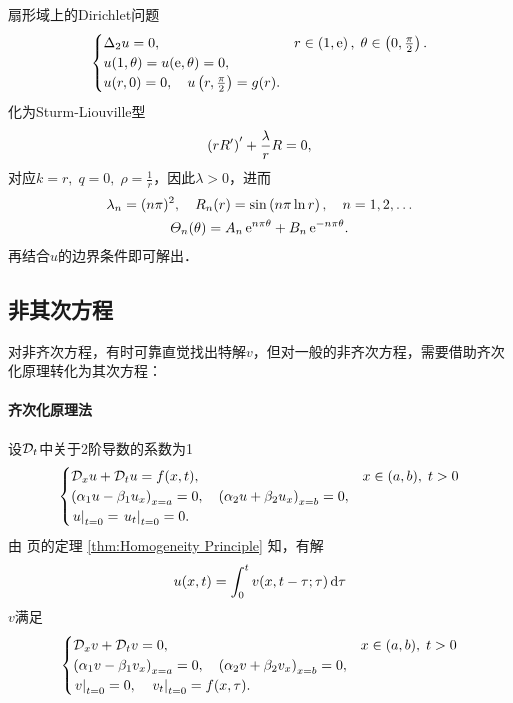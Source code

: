 \eg 扇形域上的Dirichlet问题
\begin{align*}
	\begin{cases}
		\Delta_2u=0,&r\in\left(1,\mathrm e\right),\;\theta\in\left(0,\frac\pi{2}\right).\\
		u(1,\theta)=u(\mathrm e,\theta)=0,\\
		u(r,0)=0,\quad u\left(r,\frac\pi{2}\right)=g(r).
	\end{cases}
\end{align*}
化为Sturm-Liouville型
\[\left(rR'\right)'+\frac{\lambda}rR=0,\]
对应\(k=r,\;q=0,\;\rho=\frac1r\)，因此\(\lambda>0\)，进而
\begin{gather*}
	\lambda_n=(n\pi)^2,\quad R_n(r)=\sin\left(n\pi\ln r\right),\quad n=1,2,\ldots
	\\
	\varTheta_n(\theta)=A_n\mathop{}\!\mathrm{e}^{n\pi\theta}+B_n\mathop{}\!\mathrm{e}^{-n\pi\theta}.
\end{gather*}
再结合$u$的边界条件即可解出．
\subsection{非其次方程}
对非齐次方程，有时可靠直觉找出特解$v$，但对一般的非齐次方程，需要借助齐次化原理转化为其次方程：
\paragraph*{齐次化原理法}
设$\mathcal D_t$中关于2阶导数的系数为1
\begin{align*}
	\begin{cases}
		\mathcal D_xu+\mathcal D_tu=f(x,t),& x\in(a,b),\;t>0\\
		\left(\alpha_1u-\beta_1u_x\right)_{x=a}=0,\quad\left(\alpha_2u+\beta_2u_x\right)_{x=b}=0,\\
		\left.u\right\rvert_{t=0}=\left.u_t\right\rvert_{t=0}=0.
	\end{cases}
\end{align*}
由 \pageref{thm:Homogeneity Principle} 页的定理 \ref{thm:Homogeneity Principle} 知，有解
\[u(x,t)=\int_0^tv(x,t-\tau;\tau)\mathop{}\!\mathrm{d}\tau\]
$v$满足
\begin{align*}
	\begin{cases}
		\mathcal D_xv+\mathcal D_tv=0,&x\in(a,b),\;t>0\\
		\left(\alpha_1v-\beta_1v_x\right)_{x=a}=0,\quad\left(\alpha_2v+\beta_2v_x\right)_{x=b}=0,\\
		\left.v\right\rvert_{t=0}=0,\quad\left.v_t\right\rvert_{t=0}=f(x,\tau).
	\end{cases}
\end{align*}
